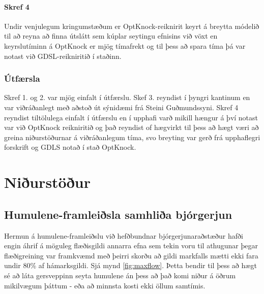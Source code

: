 \documentclass[11pt]{article}
\begin{document}
\begin{multicols}{2}
\paragraph{Skref 4}
Undir venjulegum kringumstæðum er OptKnock-reiknirit keyrt á breytta módelið til að reyna að finna útslátt sem kúplar seytingu efnisins við vöxt en keyrslutíminn á OptKnock er mjög tímafrekt og til þess að spara tíma þá var notast við GDSL\cite{lun2009large}-reikniritið í staðinn.

\subsubsection{Útfærsla}
Skref 1. og 2. var mjög einfalt í útfærslu. Skef 3. reyndist í þyngri kantinum en var viðráðanlegt með aðstoð út sýnidæmi frá Steini Guðmundssyni. Skref 4 reyndist tiltölulega einfalt í útfærslu en í upphafi varð mikill hængur á því notast var við OptKnock reikniritið og það reyndist of hægvirkt til þess að hægt væri að greina niðurstöðurnar á viðráðanlegum tíma, svo breyting var gerð frá upphaflegri forskrift og GDLS \cite{lun2009large} notað í stað OptKnock.

\section{Niðurstöður}
\subsection{Humulene-framleiðsla samhliða bjórgerjun}
Hermun á humulene-framleiðslu við hefðbundnar bjórgerjunaraðstæður hafði engin áhrif á möguleg flæðisgildi annarra efna sem tekin voru til athugunar þegar flæðigreining var framkvæmd með þeirri skorðu að gildi markfalls mætti ekki fara undir 80\% af hámarksgildi. Sjá mynd \ref{fig:maxflow}. Þetta bendir til þess að hægt sé að láta gersveppinn seyta humulene án þess að það komi niður á öðrum mikilvægum þáttum - eða að minnsta kosti ekki öllum samtímis.


\end{multicols}
\end{document}
